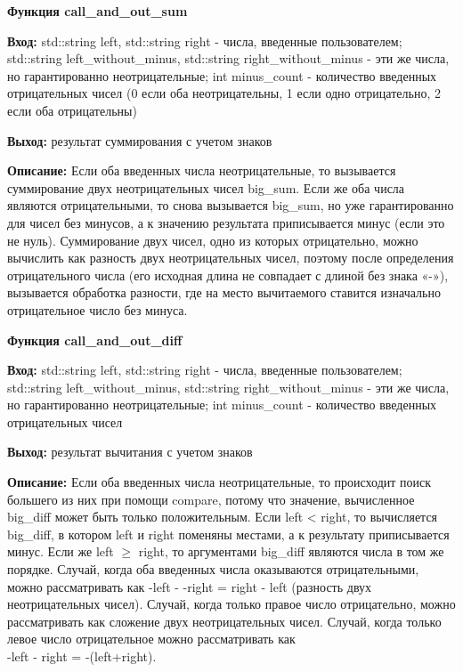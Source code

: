\textbf{Функция call\_and\_out\_sum } \par
\textbf{Вход:} std::string left, std::string right - числа, введенные пользователем; std::string left\_without\_minus, std::string right\_without\_minus - эти же числа, но гарантированно неотрицательные; int minus\_count - количество введенных отрицательных чисел (0 если оба неотрицательны, 1 если одно отрицательно, 2 если оба отрицательны)\par
\textbf{Выход:} результат суммирования с учетом знаков\par
\textbf{Описание:} Если оба введенных числа неотрицательные, то вызывается суммирование двух неотрицательных чисел big\_sum. Если же оба числа являются отрицательными, то снова вызывается big\_sum, но уже гарантированно для чисел без минусов, а к значению результата приписывается минус (если это не нуль). Суммирование двух чисел, одно из которых отрицательно, можно вычислить как разность двух неотрицательных чисел, поэтому после определения отрицательного числа (его исходная длина не совпадает с длиной без знака «-»), вызывается обработка разности, где на место вычитаемого ставится изначально отрицательное число без минуса.\par
\vspace{10pt}

\textbf{Функция call\_and\_out\_diff } \par
\textbf{Вход:} std::string left, std::string right - числа, введенные пользователем; std::string left\_without\_minus, std::string right\_without\_minus - эти же числа, но гарантированно неотрицательные; int minus\_count - количество введенных отрицательных чисел \par
\textbf{Выход:} результат вычитания с учетом знаков\par
\textbf{Описание:} Если оба введенных числа неотрицательные, то происходит поиск большего из них при помощи compare, потому что значение, вычисленное big\_diff может быть только положительным. Если left < right, то вычисляется big\_diff, в котором left и right поменяны местами, а к результату приписывается минус. Если же left $\geq$ right, то аргументами big\_diff являются числа в том же порядке. Случай, когда оба введенных числа оказываются отрицательными, можно рассматривать как -left - -right = right - left (разность двух неотрицательных чисел). Случай, когда только правое число отрицательно, можно рассматривать как сложение двух неотрицательных чисел. Случай, когда только левое число отрицательное можно рассматривать как \\ -left - right = -(left+right).\par
\vspace{10pt}

